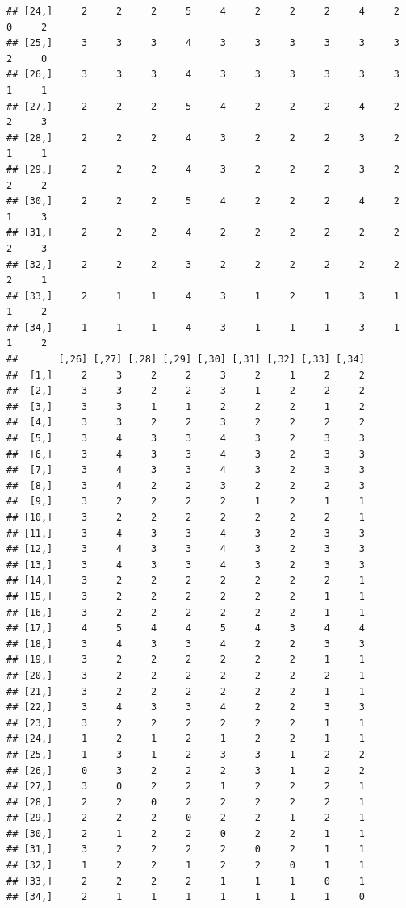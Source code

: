 \documentclass[
]{article}
\begin{document}
\begin{verbatim}
## [24,]     2     2     2     5     4     2     2     2     4     2     0     2
## [25,]     3     3     3     4     3     3     3     3     3     3     2     0
## [26,]     3     3     3     4     3     3     3     3     3     3     1     1
## [27,]     2     2     2     5     4     2     2     2     4     2     2     3
## [28,]     2     2     2     4     3     2     2     2     3     2     1     1
## [29,]     2     2     2     4     3     2     2     2     3     2     2     2
## [30,]     2     2     2     5     4     2     2     2     4     2     1     3
## [31,]     2     2     2     4     2     2     2     2     2     2     2     3
## [32,]     2     2     2     3     2     2     2     2     2     2     2     1
## [33,]     2     1     1     4     3     1     2     1     3     1     1     2
## [34,]     1     1     1     4     3     1     1     1     3     1     1     2
##       [,26] [,27] [,28] [,29] [,30] [,31] [,32] [,33] [,34]
##  [1,]     2     3     2     2     3     2     1     2     2
##  [2,]     3     3     2     2     3     1     2     2     2
##  [3,]     3     3     1     1     2     2     2     1     2
##  [4,]     3     3     2     2     3     2     2     2     2
##  [5,]     3     4     3     3     4     3     2     3     3
##  [6,]     3     4     3     3     4     3     2     3     3
##  [7,]     3     4     3     3     4     3     2     3     3
##  [8,]     3     4     2     2     3     2     2     2     3
##  [9,]     3     2     2     2     2     1     2     1     1
## [10,]     3     2     2     2     2     2     2     2     1
## [11,]     3     4     3     3     4     3     2     3     3
## [12,]     3     4     3     3     4     3     2     3     3
## [13,]     3     4     3     3     4     3     2     3     3
## [14,]     3     2     2     2     2     2     2     2     1
## [15,]     3     2     2     2     2     2     2     1     1
## [16,]     3     2     2     2     2     2     2     1     1
## [17,]     4     5     4     4     5     4     3     4     4
## [18,]     3     4     3     3     4     2     2     3     3
## [19,]     3     2     2     2     2     2     2     1     1
## [20,]     3     2     2     2     2     2     2     2     1
## [21,]     3     2     2     2     2     2     2     1     1
## [22,]     3     4     3     3     4     2     2     3     3
## [23,]     3     2     2     2     2     2     2     1     1
## [24,]     1     2     1     2     1     2     2     1     1
## [25,]     1     3     1     2     3     3     1     2     2
## [26,]     0     3     2     2     2     3     1     2     2
## [27,]     3     0     2     2     1     2     2     2     1
## [28,]     2     2     0     2     2     2     2     2     1
## [29,]     2     2     2     0     2     2     1     2     1
## [30,]     2     1     2     2     0     2     2     1     1
## [31,]     3     2     2     2     2     0     2     1     1
## [32,]     1     2     2     1     2     2     0     1     1
## [33,]     2     2     2     2     1     1     1     0     1
## [34,]     2     1     1     1     1     1     1     1     0
\end{verbatim}
\end{document}
